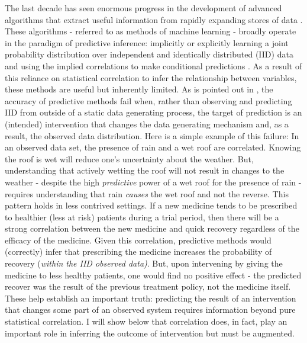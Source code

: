 \documentclass[../main.tex]{subfiles}
\begin{document}
The last decade has seen enormous progress in the development of advanced algorithms that extract useful information from rapidly expanding stores of data \cite{Lecun2015DeepLearning}. These algorithms - referred to as methods of machine learning - broadly operate in the paradigm of predictive inference: implicitly or explicitly learning a joint probability distribution over independent and identically distributed (IID) data and using the implied correlations to make conditional predictions \cite{Scholkopf2019CausalityLearning}. As a result of this reliance on statistical correlation to infer the relationship between variables, these methods are useful but inherently limited. As is pointed out in \cite{Pearl2009CausalOverview}, the accuracy of predictive methods fail when, rather than observing and predicting IID from outside of a static data generating process, the target of prediction is an (intended) intervention that changes the data generating mechanism and, as a result, the observed data distribution. Here is a simple example of this failure: In an observed data set, the presence of rain and a wet roof are correlated. Knowing the roof is wet will reduce one’s uncertainty about the weather. But, understanding that actively wetting the roof will not result in changes to the weather - despite the high \textit{predictive} power of a wet roof for the presence of rain - requires understanding that rain \textit{causes} the wet roof and not the reverse. This pattern holds in less contrived settings. If a new medicine tends to be prescribed to healthier (less at risk) patients during a trial period, then there will be a strong correlation between the new medicine and quick recovery regardless of the efficacy of the medicine. Given this correlation, predictive methods would (correctly) infer that prescribing the medicine increases the probability of recovery (\textit{within the IID observed data)}. But, upon intervening by giving the medicine to less healthy patients, one would find no positive effect - the predicted recover was the result of the previous treatment policy, not the medicine itself. These help establish an important truth: predicting the result of an intervention that changes some part of an observed system requires information beyond pure statistical correlation. I will show below that correlation does, in fact, play an important role in inferring the outcome of intervention but must be augmented.\par
\end{document}
